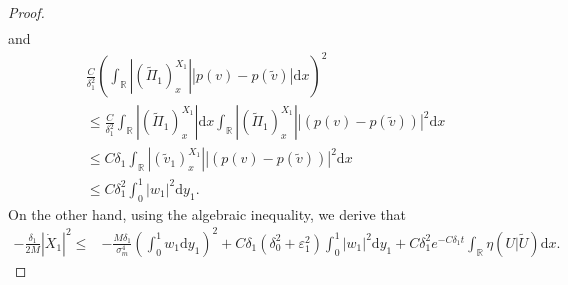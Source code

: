 \documentclass[10pt,reqno]{amsart}
\numberwithin{equation}{section}
\newcommand{\dif}{\mathrm{d}}
\begin{document}
\begin{proof}
\begin{align*}
\end{align*}
and
\begin{align*}
&\frac{C}{\delta_1^2}\left(\int_\mathbb{R}|(\widetilde{\Pi}_1)^{X_1}_x|
|p(v)-p(\widetilde{v})|\dif x\right)^2\\
&\le\frac{C}{\delta_1^2}\int_\mathbb{R}|(\widetilde{\Pi}_1)^{X_1}_x|\dif x
\int_\mathbb{R}|(\widetilde{\Pi}_1)^{X_1}_x||
(p(v)-p(\widetilde{v}))|^2\dif x\\
&\le C\delta_1\int_\mathbb{R}|(\widetilde{v}_1)^{X_1}_x||
(p(v)-p(\widetilde{v}))|^2\dif x\\
&\le C\delta_1^2\int_0^1|w_1|^2\dif y_1.
\end{align*}
On the other hand, using the algebraic inequality, we derive that
\begin{align*}
-\frac{\delta_1}{2M}|\dot{X}_1|^2\le&-\frac{M\delta_1}{\sigma_m^4}\left(\int_0^1w_1\dif y_1\right)^2
+C\delta_1(\delta_0^2+\varepsilon_1^2)\int_0^1|w_1|^2\dif y_1
+C\delta_1^2 e^{-C\delta_1 t}\int_\mathbb{R}\eta(U|\widetilde{U})\dif x.
\end{align*}


\end{proof}
\end{document}
